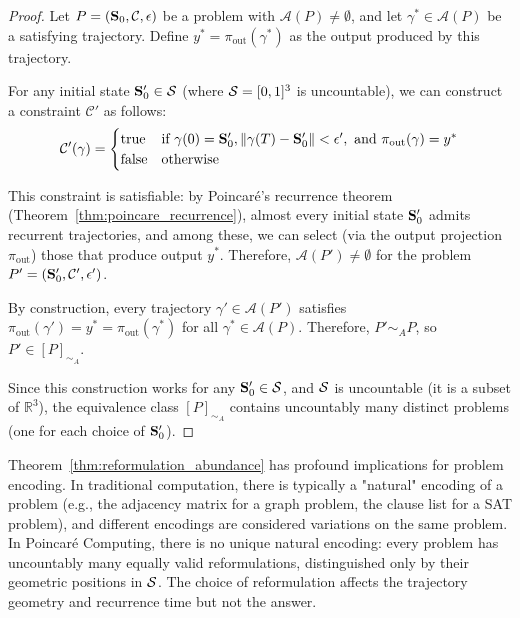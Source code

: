 \begin{proof}
Let $P = (\mathbf{S}_0, \mathcal{C}, \epsilon)$ be a problem with $\mathcal{A}(P) \neq \emptyset$, and let $\gamma^* \in \mathcal{A}(P)$ be a satisfying trajectory. Define $y^* = \pi_{\text{out}}(\gamma^*)$ as the output produced by this trajectory.

For any initial state $\mathbf{S}_0' \in \mathcal{S}$ (where $\mathcal{S} = [0,1]^3$ is uncountable), we can construct a constraint $\mathcal{C}'$ as follows:
\begin{equation}
\mathcal{C}'(\gamma) = \begin{cases}
\text{true} & \text{if } \gamma(0) = \mathbf{S}_0', \|\gamma(T) - \mathbf{S}_0'\| < \epsilon', \text{ and } \pi_{\text{out}}(\gamma) = y^* \\
\text{false} & \text{otherwise}
\end{cases}
\end{equation}

This constraint is satisfiable: by Poincaré's recurrence theorem (Theorem~\ref{thm:poincare_recurrence}), almost every initial state $\mathbf{S}_0'$ admits recurrent trajectories, and among these, we can select (via the output projection $\pi_{\text{out}}$) those that produce output $y^*$. Therefore, $\mathcal{A}(P') \neq \emptyset$ for the problem $P' = (\mathbf{S}_0', \mathcal{C}', \epsilon')$.

By construction, every trajectory $\gamma' \in \mathcal{A}(P')$ satisfies $\pi_{\text{out}}(\gamma') = y^* = \pi_{\text{out}}(\gamma^*)$ for all $\gamma^* \in \mathcal{A}(P)$. Therefore, $P' \sim_A P$, so $P' \in [P]_{\sim_A}$.

Since this construction works for any $\mathbf{S}_0' \in \mathcal{S}$, and $\mathcal{S}$ is uncountable (it is a subset of $\mathbb{R}^3$), the equivalence class $[P]_{\sim_A}$ contains uncountably many distinct problems (one for each choice of $\mathbf{S}_0'$).
\end{proof}

\begin{remark}
\label{rem:encoding_implications}
Theorem~\ref{thm:reformulation_abundance} has profound implications for problem encoding. In traditional computation, there is typically a "natural" encoding of a problem (e.g., the adjacency matrix for a graph problem, the clause list for a SAT problem), and different encodings are considered variations on the same problem. In Poincaré Computing, there is no unique natural encoding: every problem has uncountably many equally valid reformulations, distinguished only by their geometric positions in $\mathcal{S}$. The choice of reformulation affects the trajectory geometry and recurrence time but not the answer.
\end{remark}

